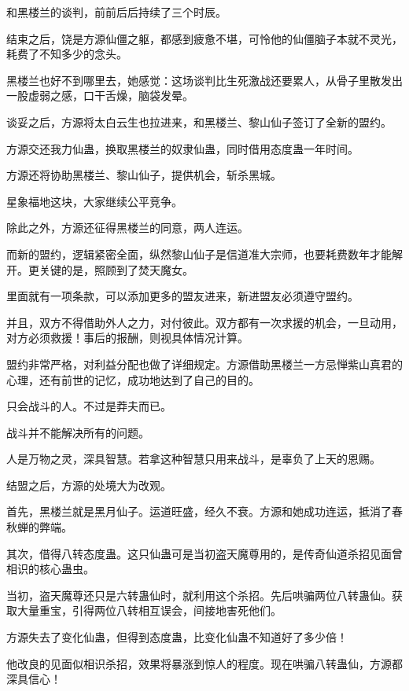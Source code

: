 
\begin{this_body}

和黑楼兰的谈判，前前后后持续了三个时辰。

结束之后，饶是方源仙僵之躯，都感到疲惫不堪，可怜他的仙僵脑子本就不灵光，耗费了不知多少的念头。

黑楼兰也好不到哪里去，她感觉：这场谈判比生死激战还要累人，从骨子里散发出一股虚弱之感，口干舌燥，脑袋发晕。

谈妥之后，方源将太白云生也拉进来，和黑楼兰、黎山仙子签订了全新的盟约。

方源交还我力仙蛊，换取黑楼兰的奴隶仙蛊，同时借用态度蛊一年时间。

方源还将协助黑楼兰、黎山仙子，提供机会，斩杀黑城。

星象福地这块，大家继续公平竞争。

除此之外，方源还征得黑楼兰的同意，两人连运。

而新的盟约，逻辑紧密全面，纵然黎山仙子是信道准大宗师，也要耗费数年才能解开。更关键的是，照顾到了焚天魔女。

里面就有一项条款，可以添加更多的盟友进来，新进盟友必须遵守盟约。

并且，双方不得借助外人之力，对付彼此。双方都有一次求援的机会，一旦动用，对方必须救援！事后的报酬，则视具体情况计算。

盟约非常严格，对利益分配也做了详细规定。方源借助黑楼兰一方忌惮紫山真君的心理，还有前世的记忆，成功地达到了自己的目的。

只会战斗的人。不过是莽夫而已。

战斗并不能解决所有的问题。

人是万物之灵，深具智慧。若拿这种智慧只用来战斗，是辜负了上天的恩赐。

结盟之后，方源的处境大为改观。

首先，黑楼兰就是黑月仙子。运道旺盛，经久不衰。方源和她成功连运，抵消了春秋蝉的弊端。

其次，借得八转态度蛊。这只仙蛊可是当初盗天魔尊用的，是传奇仙道杀招见面曾相识的核心蛊虫。

当初，盗天魔尊还只是六转蛊仙时，就利用这个杀招。先后哄骗两位八转蛊仙。获取大量重宝，引得两位八转相互误会，间接地害死他们。

方源失去了变化仙蛊，但得到态度蛊，比变化仙蛊不知道好了多少倍！

他改良的见面似相识杀招，效果将暴涨到惊人的程度。现在哄骗八转蛊仙，方源都深具信心！


\end{this_body}
